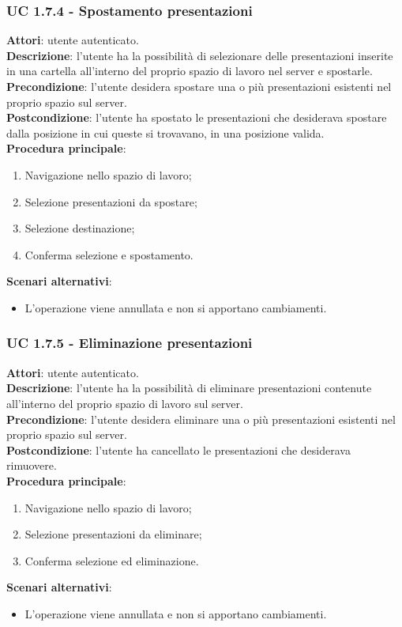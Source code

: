 	\subsubsection{UC 1.7.4 - Spostamento presentazioni}{
		\label{uc1.7.4}
		\textbf{Attori}: utente autenticato.	\\
		\textbf{Descrizione}: l'utente ha la possibilità di selezionare delle presentazioni inserite in una cartella all'interno del proprio spazio di lavoro nel server e spostarle. \\
		\textbf{Precondizione}: l'utente desidera spostare una o più presentazioni esistenti nel proprio spazio sul server.	\\
		\textbf{Postcondizione}: l'utente ha spostato le presentazioni che desiderava spostare dalla posizione in cui queste si trovavano, in una posizione valida.	\\
		\textbf{Procedura principale}:
		\begin{enumerate}
			\item Navigazione nello spazio di lavoro;
			\item Selezione presentazioni da spostare;
			\item Selezione destinazione;
			\item Conferma selezione e spostamento.
		\end{enumerate}
		\textbf{Scenari alternativi}: 
		\begin{itemize}
			\item L'operazione viene annullata e non si apportano cambiamenti.
		\end{itemize}
		}
	\subsubsection{UC 1.7.5 - Eliminazione presentazioni}{
		\label{uc1.7.5}
		\textbf{Attori}: utente autenticato.	\\
		\textbf{Descrizione}: l'utente ha la possibilità di eliminare presentazioni contenute all'interno del proprio spazio di lavoro sul server. \\
		\textbf{Precondizione}: l'utente desidera eliminare una o più presentazioni esistenti nel proprio spazio sul server.	\\
		\textbf{Postcondizione}: l'utente ha cancellato le presentazioni che desiderava rimuovere.	\\
		\textbf{Procedura principale}:
		\begin{enumerate}
			\item Navigazione nello spazio di lavoro;
			\item Selezione presentazioni da eliminare;
			\item Conferma selezione ed eliminazione.
		\end{enumerate}
		\textbf{Scenari alternativi}: 
		\begin{itemize}
			\item L'operazione viene annullata e non si apportano cambiamenti.
		\end{itemize}
		}
